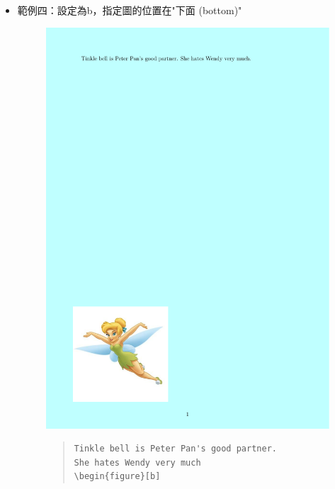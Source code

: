 \documentclass[12pt,a4paper]{report}
\begin{document}
\begin{CJK}{UTF8}{bkai}
\begin{itemize}
\item 範例四：設定為b，指定圖的位置在"下面 (bottom)"
\begin{figure}[!h] 
\begin{minipage}[b]{0.5\textwidth} 
\centering 
\includegraphics[scale=0.3]{./pics/float_example_10.pdf} 
\end{minipage}%
\begin{minipage}[b]{0.5\textwidth} 
\begin{footnotesize}
\begin{quote}
\begin{verbatim}
Tinkle bell is Peter Pan's good partner. 
She hates Wendy very much
\begin{figure}[b]

\end{verbatim}
\end{quote}
\end{footnotesize}
\end{minipage}
\end{figure}
\end{itemize}
\end{CJK}
\end{document}
